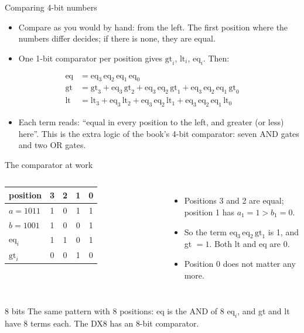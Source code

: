 \documentclass[10pt]{wosm-slides}
\begin{document}
\begin{frame}{Comparing 4-bit numbers}
  \begin{itemize}
    \item Compare as you would by hand: from the left. The first position where the
      numbers differ decides; if there is none, they are equal.
    \item One 1-bit comparator per position gives $\mathrm{gt}_i$, $\mathrm{lt}_i$,
      $\mathrm{eq}_i$. Then:
  \end{itemize}
  \begin{align*}
    \mathrm{eq} &= \mathrm{eq}_3\, \mathrm{eq}_2\, \mathrm{eq}_1\, \mathrm{eq}_0 \\
    \mathrm{gt} &= \mathrm{gt}_3 + \mathrm{eq}_3\, \mathrm{gt}_2
      + \mathrm{eq}_3\, \mathrm{eq}_2\, \mathrm{gt}_1
      + \mathrm{eq}_3\, \mathrm{eq}_2\, \mathrm{eq}_1\, \mathrm{gt}_0 \\
    \mathrm{lt} &= \mathrm{lt}_3 + \mathrm{eq}_3\, \mathrm{lt}_2
      + \mathrm{eq}_3\, \mathrm{eq}_2\, \mathrm{lt}_1
      + \mathrm{eq}_3\, \mathrm{eq}_2\, \mathrm{eq}_1\, \mathrm{lt}_0
  \end{align*}
  \begin{itemize}
    \item Each term reads: ``equal in every position to the left, and greater (or
      less) here''. This is the extra logic of the book's 4-bit comparator: seven AND
      gates and two OR gates.
  \end{itemize}
\end{frame}

\begin{frame}{The comparator at work}
  \begin{columns}[c, totalwidth=\textwidth]
      \centering
      \begin{tabular}{@{}lcccc@{}}
        position & 3 & 2 & 1 & 0 \\
        \midrule
        $a = 1011$ & 1 & 0 & 1 & 1 \\
        $b = 1001$ & 1 & 0 & 0 & 1 \\
        \midrule
        $\mathrm{eq}_i$ & 1 & 1 & 0 & 1 \\
        $\mathrm{gt}_i$ & 0 & 0 & 1 & 0 \\
      \end{tabular}
      \begin{itemize}
        \item Positions 3 and 2 are equal; position 1 has $a_1 = 1 > b_1 = 0$.
        \item So the term $\mathrm{eq}_3\, \mathrm{eq}_2\, \mathrm{gt}_1$ is 1, and
          gt $= 1$. Both lt and eq are 0.
        \item Position 0 does not matter any more.
      \end{itemize}
  \end{columns}

  \begin{block}{8 bits}
    The same pattern with 8 positions: eq is the AND of 8 $\mathrm{eq}_i$, and gt and
    lt have 8 terms each. The DX8 has an 8-bit comparator.
  \end{block}
\end{frame}
\end{document}
